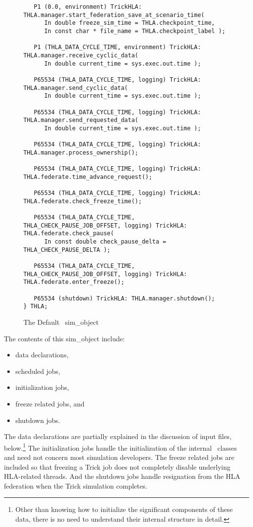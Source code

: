 \begin{figure}[th]
\begin{center}
\begin{verbatim}
   P1 (0.0, environment) TrickHLA: THLA.manager.start_federation_save_at_scenario_time(
      In double freeze_sim_time = THLA.checkpoint_time,
      In const char * file_name = THLA.checkpoint_label );

   P1 (THLA_DATA_CYCLE_TIME, environment) TrickHLA: THLA.manager.receive_cyclic_data(
      In double current_time = sys.exec.out.time );

   P65534 (THLA_DATA_CYCLE_TIME, logging) TrickHLA: THLA.manager.send_cyclic_data(
      In double current_time = sys.exec.out.time );

   P65534 (THLA_DATA_CYCLE_TIME, logging) TrickHLA: THLA.manager.send_requested_data(
      In double current_time = sys.exec.out.time );

   P65534 (THLA_DATA_CYCLE_TIME, logging) TrickHLA: THLA.manager.process_ownership();

   P65534 (THLA_DATA_CYCLE_TIME, logging) TrickHLA: THLA.federate.time_advance_request();

   P65534 (THLA_DATA_CYCLE_TIME, logging) TrickHLA: THLA.federate.check_freeze_time();

   P65534 (THLA_DATA_CYCLE_TIME, THLA_CHECK_PAUSE_JOB_OFFSET, logging) TrickHLA: THLA.federate.check_pause( 
      In const double check_pause_delta = THLA_CHECK_PAUSE_DELTA );

   P65534 (THLA_DATA_CYCLE_TIME, THLA_CHECK_PAUSE_JOB_OFFSET, logging) TrickHLA: THLA.federate.enter_freeze();

   P65534 (shutdown) TrickHLA: THLA.manager.shutdown();
} THLA;
    \end{verbatim}
  \end{center}
\caption{The Default \TrickHLA\ {\ttfamily sim\_object}}
\label{fig:default-sim-object}
\end{figure}

The contents of this {\ttfamily sim\_object} include:
\begin{itemize}
  \item{data declarations,}
  \item{scheduled jobs,}
  \item{initialization jobs,}
  \item{freeze related jobs, and}
  \item{shutdown jobs.}
\end{itemize}

The data declarations are partially explained in the discussion of
input files, below.\footnote{
Other than knowing how to initialize the significant components of these data,
there is no need to understand their internal structure in detail.
}
The initialization jobs handle the initialization of the internal \TrickHLA\
classes and need not concern most simulation developers.
The freeze related jobs are included so that freezing a Trick job does not
completely disable underlying HLA-related threads.
And the shutdown jobs handle resignation from the HLA federation when the
Trick simulation completes.


